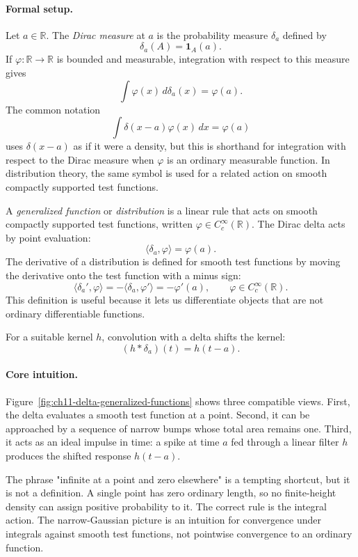 \paragraph{Formal setup.}
Let \(a\in\mathbb{R}\). The \emph{Dirac measure} at \(a\) is the probability measure \(\delta_a\) defined by
\[
\delta_a(A)=\mathbf{1}_A(a).
\]
If \(\varphi:\mathbb{R}\to\mathbb{R}\) is bounded and measurable, integration with respect to this measure gives
\[
\int \varphi(x)\,d\delta_a(x)=\varphi(a).
\]
The common notation
\[
\int \delta(x-a)\varphi(x)\,dx=\varphi(a)
\]
uses \(\delta(x-a)\) as if it were a density, but this is shorthand for integration with respect to the Dirac measure when \(\varphi\) is an ordinary measurable function. In distribution theory, the same symbol is used for a related action on smooth compactly supported test functions.

A \emph{generalized function} or \emph{distribution} is a linear rule that acts on smooth compactly supported test functions, written \(\varphi\in C_c^\infty(\mathbb{R})\). The Dirac delta acts by point evaluation:
\[
\langle \delta_a,\varphi\rangle=\varphi(a).
\]
The derivative of a distribution is defined for smooth test functions by moving the derivative onto the test function with a minus sign:
\[
\langle \delta_a',\varphi\rangle=-\langle \delta_a,\varphi'\rangle=-\varphi'(a),
\qquad \varphi\in C_c^\infty(\mathbb{R}).
\]
This definition is useful because it lets us differentiate objects that are not ordinary differentiable functions.

For a suitable kernel \(h\), convolution with a delta shifts the kernel:
\[
(h*\delta_a)(t)=h(t-a).
\]

\paragraph{Core intuition.}
Figure~\ref{fig:ch11-delta-generalized-functions} shows three compatible views. First, the delta evaluates a smooth test function at a point. Second, it can be approached by a sequence of narrow bumps whose total area remains one. Third, it acts as an ideal impulse in time: a spike at time \(a\) fed through a linear filter \(h\) produces the shifted response \(h(t-a)\).

The phrase "infinite at a point and zero elsewhere" is a tempting shortcut, but it is not a definition. A single point has zero ordinary length, so no finite-height density can assign positive probability to it. The correct rule is the integral action. The narrow-Gaussian picture is an intuition for convergence under integrals against smooth test functions, not pointwise convergence to an ordinary function.

